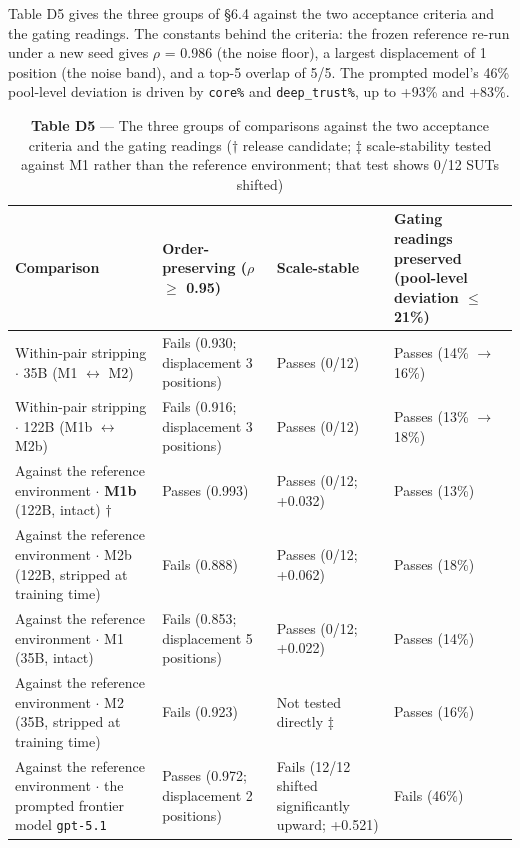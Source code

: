 \documentclass[letterpaper]{article}
\begin{document}
Table D5 gives the three groups of \S{}6.4 against the two acceptance criteria and the gating readings. The constants behind the criteria: the frozen reference re-run under a new seed gives $\rho$ = 0.986 (the noise floor), a largest displacement of 1 position (the noise band), and a top-5 overlap of 5/5. The prompted model's 46\% pool-level deviation is driven by \texttt{core\%} and \texttt{deep\_trust\%}, up to +93\% and +83\%.


\begin{table}[t]
\centering\footnotesize
\setlength{\tabcolsep}{4pt}
\caption{\textbf{Table D5} --- The three groups of comparisons against the two acceptance criteria and the gating readings ($\dagger$ release candidate; ‡ scale-stability tested against M1 rather than the reference environment; that test shows 0/12 SUTs shifted)}
\begin{tabular}{@{}>{\raggedright\arraybackslash}p{}>{\raggedright\arraybackslash}p{}>{\raggedright\arraybackslash}p{}>{\raggedright\arraybackslash}p{}@{}}
\toprule
Comparison & Order-preserving ($\rho$ $\geq$ 0.95) & Scale-stable & Gating readings preserved (pool-level deviation $\leq$ 21\%) \\
\midrule
Within-pair stripping $\cdot$ 35B (M1 $\leftrightarrow$ M2) & Fails (0.930; displacement 3 positions) & Passes (0/12) & Passes (14\% $\rightarrow$ 16\%) \\
Within-pair stripping $\cdot$ 122B (M1b $\leftrightarrow$ M2b) & Fails (0.916; displacement 3 positions) & Passes (0/12) & Passes (13\% $\rightarrow$ 18\%) \\
Against the reference environment $\cdot$ \textbf{M1b} (122B, intact) $\dagger$ & Passes (0.993) & Passes (0/12; +0.032) & Passes (13\%) \\
Against the reference environment $\cdot$ M2b (122B, stripped at training time) & Fails (0.888) & Passes (0/12; +0.062) & Passes (18\%) \\
Against the reference environment $\cdot$ M1 (35B, intact) & Fails (0.853; displacement 5 positions) & Passes (0/12; +0.022) & Passes (14\%) \\
Against the reference environment $\cdot$ M2 (35B, stripped at training time) & Fails (0.923) & Not tested directly ‡ & Passes (16\%) \\
Against the reference environment $\cdot$ the prompted frontier model \texttt{gpt-5.1} & Passes (0.972; displacement 2 positions) & Fails (12/12 shifted significantly upward; +0.521) & Fails (46\%) \\
\bottomrule
\end{tabular}
\end{table}
\end{document}

